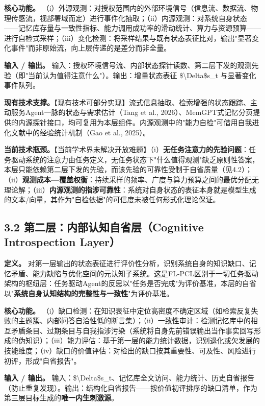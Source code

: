 \documentclass[11pt,a4paper]{ctexart}
\begin{document}
\textbf{核心功能。} （i）外源观测：对授权范围内的外部环境信号（信息流、数据流、物理传感流，视部署域而定）进行事件化抽取；（ii）内源观测：对系统自身状态——记忆库存量与一致性指标、能力调用成功率的滑动统计、算力与资源预算——进行自检式采样；（iii）变化检测：将采样结果与既有状态表征比对，输出"显著变化事件"而非原始流，向上层传递的是差分而非全量。

\textbf{输入 / 输出。} 输入：授权环境信号流、内部状态探针读数、第二层下发的观测先验（即"当前认为值得注意什么"）。输出：增量状态表征 \$\textbackslash{}Delta\$s\_t 与显著变化事件队列。

\textbf{现有技术支撑。}【现有技术可部分实现】流式信息抽取、检索增强的状态跟踪、主动服务Agent一脉的状态与需求估计（Tang et al., 2026）、MemGPT式记忆分页提供的内源探针接口，均可复用为本层组件。内源观测中的"能力自检"可借用自我进化文献中的经验统计机制（Gao et al., 2025）。

\textbf{当前技术瓶颈。}【当前学术界未解决开放难题】（i）\textbf{无任务注意力的先验问题}：任务驱动系统的注意力由任务定义，无任务状态下"什么值得观测"缺乏原则性答案，本层只能依赖第二层下发的先验，而该先验的可靠性受制于自省质量（见4.2）；（ii）\textbf{观测成本—覆盖权衡}：持续采样的频率、广度与算力预算之间的最优分配无理论解；（iii）\textbf{内源观测的指涉可靠性}：系统对自身状态的表征本身就是模型生成的文本/向量，其作为"自检依据"的可信度未被任何形式化理论保证。

\subsection{3.2 第二层：内部认知自省层（Cognitive Introspection Layer）}

\textbf{定义。} 对第一层输出的状态表征进行评价性分析，识别系统自身的知识缺口、记忆矛盾、能力缺陷与优化空间的元认知子系统。这是FL-PCL区别于一切任务驱动架构的枢纽层：任务驱动Agent的反思以"任务是否完成"为评价基准，本层的自省以"\textbf{系统自身认知结构的完整性与一致性}"为评价基准。

\textbf{核心功能。} （i）缺口检测：在知识表征中定位高密度不确定区域（如检索反复失败的主题簇、内部问答自洽性低的断言集）；（ii）一致性审计：检测记忆库中的相互矛盾条目、过期条目与自我指涉污染（系统将自身先前错误输出当作事实回写形成的伪知识）；（iii）能力评估：基于第一层的能力统计数据，识别退化或欠发展的技能维度；（iv）缺口的价值评估：对检出的缺口按其重要性、可及性、风险进行初评，形成"自省报告"。

\textbf{输入 / 输出。} 输入：\$\textbackslash{}Delta\$s\_t、记忆库全文访问、能力统计、历史自省报告（防止重复发现）。输出：结构化自省报告——按价值初评排序的缺口清单，作为第三层目标生成的\textbf{唯一内生刺激源}。
\end{document}
